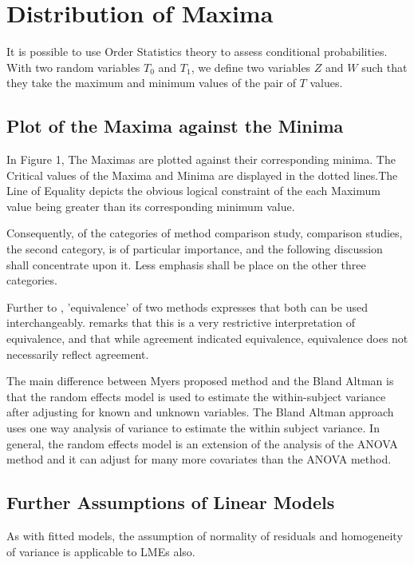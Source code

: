 \documentclass[12pt, a4paper]{report}
\theoremstyle{plain}
\theoremstyle{definition}
\theoremstyle{remark}
\begin{document}
\section{Distribution of Maxima} It is possible to use Order
Statistics theory to assess conditional probabilities. With two
random variables $T_{0}$ and $T_{1}$, we define two variables $Z$
and $W$ such that they take the maximum and minimum values of the
pair of $T$ values.

\subsection{Plot of the Maxima against the Minima}


In Figure 1,  The Maximas are plotted against their corresponding
minima. The Critical values of the Maxima and Minima are displayed
in the dotted lines.The Line of Equality depicts the obvious
logical constraint of the each Maximum value being greater than
its corresponding minimum value.




Consequently, of the categories of method comparison study,
comparison studies, the second category, is of particular
importance, and the following discussion shall concentrate upon
it. Less emphasis shall be place on the other three categories.

\bigskip Further to \citet{BA86}, 'equivalence' of two methods expresses
that both can be used interchangeably.
\citet[p.49]{DunnSEME} remarks that this is a very restrictive
interpretation of equivalence, and that while agreement indicated
equivalence, equivalence does not necessarily reflect agreement.

The main difference between Myers proposed method and the Bland Altman is that the random effects model is used to estimate the
within-subject variance after adjusting for known and unknown variables. The Bland Altman approach uses one way analysis of
variance to estimate the within subject variance. In general, the random effects model is an extension of the analysis of the ANOVA method and it can adjust for many more covariates than the ANOVA method.




\subsection{Further Assumptions of Linear Models}

As with fitted models, the assumption of normality of residuals and homogeneity of variance is applicable to LMEs also. 
\end{document}
